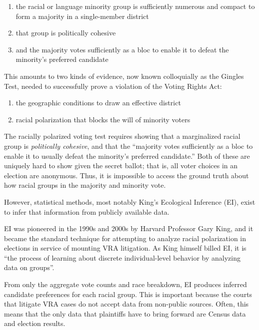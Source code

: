 \documentclass[fleqn,10pt]{style}
\begin{document}
\begin{enumerate}[noitemsep]
 \item the racial or language minority group is sufficiently numerous and compact to form a majority in a single-member district
 \item that group is politically cohesive
 \item and the majority votes sufficiently as a bloc to enable it to defeat the minority’s preferred candidate
\end{enumerate}

This amounts to two kinds of evidence, now known colloquially as the Gingles Test, needed to successfully prove a violation of the Voting Rights Act:

\begin{enumerate}[noitemsep]
 \item the geographic conditions to draw an effective district
 \item racial polarization that blocks the will of minority voters
\end{enumerate}

The racially polarized voting test requires showing that a marginalized racial group is \textit{politically cohesive}, and that the “majority votes sufficiently as a bloc to enable it to usually defeat the minority’s preferred candidate.” Both of these are uniquely hard to show given the secret ballot; that is, all voter choices in an election are anonymous. Thus, it is impossible to access the ground truth about how racial groups in the majority and minority vote.

However, statistical methods, most notably King’s Ecological Inference (EI)\cite{king1999}, exist to infer that information from publicly available data.

EI was pioneered in the 1990s and 2000s by Harvard Professor Gary King, and it became the standard technique for attempting to analyze racial polarization in elections in service of mounting VRA litigation. As King himself billed EI, it is “the process of learning about discrete individual-level behavior by analyzing data on groups”\cite{king1999}.

From only the aggregate vote counts and race breakdown, EI produces inferred candidate preferences for each racial group. This is important because the courts that litigate VRA cases do not accept data from non-public sources. Often, this means that the only data that plaintiffs have to bring forward are Census data and election results.
\end{document}
